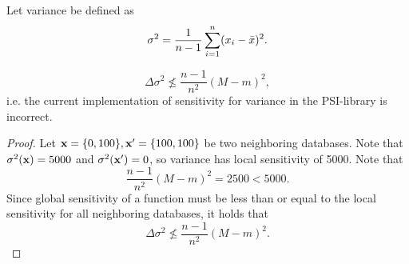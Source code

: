 \documentclass[11pt, oneside]{article}   	%
\begin{document}
\begin{definition}
Let variance be defined as 
$$ \sigma^2 = \frac{1}{n-1} \sum_{i=1}^n (x_i - \bar{x})^2.$$
\end{definition}

\begin{lemma}
$$\Delta \sigma^2 \nleq \frac{n-1}{n^2}(M-m)^2,$$
i.e. the current implementation of sensitivity for variance in the PSI-library is incorrect.
\end{lemma}

\begin{proof}
Let $\textbf{x} = \{0,100\}, \textbf{x}' = \{100,100\}$ be two neighboring databases. Note that $\sigma^2(\textbf{x}) = 5000$ and $\sigma^2(\textbf{x}')=0$, so variance has local sensitivity of 5000. Note that
$$\frac{n-1}{n^2}(M-m)^2 = 2500 < 5000.$$
Since global sensitivity of a function must be less than or equal to the local sensitivity for all neighboring databases, it holds that 
$$\Delta \sigma^2 \nleq \frac{n-1}{n^2}(M-m)^2.$$
\end{proof}

%
\end{document}
